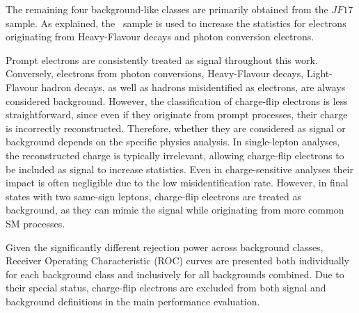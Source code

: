 The remaining four background-like classes are primarily obtained from the $JF17$ sample. As explained, the \ttbar\ sample is used to increase the statistics for electrons originating from Heavy-Flavour decays and photon conversion electrons.

Prompt electrons are consistently treated as signal throughout this work. Conversely, electrons from photon conversions, Heavy-Flavour decays, Light-Flavour hadron decays, as well as hadrons misidentified as electrons, are always considered background. However, the classification of charge-flip electrons is less straightforward, since even if they originate from prompt processes, their charge is incorrectly reconstructed. Therefore, whether they are considered as signal or background depends on the specific physics analysis.
In single-lepton analyses, the reconstructed charge is typically irrelevant, allowing charge-flip electrons to be included as signal to increase statistics. Even in charge-sensitive analyses their impact is often negligible due to the low misidentification rate. However, in final states with two same-sign leptons, charge-flip electrons are treated as background, as they can mimic the signal while originating from more common SM processes.

Given the significantly different rejection power across background classes, Receiver Operating Characteristic (ROC) curves are presented both individually for each background class and inclusively for all backgrounds combined. Due to their special status, charge-flip electrons are excluded from both signal and background definitions in the main performance evaluation.

